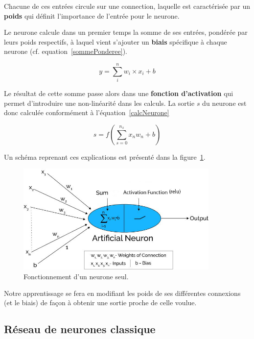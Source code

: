 Chacune de ces entrées circule sur une connection, laquelle est caractérisée par un \textbf{poids} qui définit l'importance de l'entrée pour le neurone.

Le neurone calcule dans un premier temps la somme de ses entrées, pondérée par leurs poids respectifs, à laquel vient s'ajouter un \textbf{biais} spécifique à chaque neurone (cf. equation~\ref{sommePonderee}).

\begin{equation}
\label{sommePonderee}
y = \sum_{i}^{n} w_i \times x_i + b
\end{equation}

Le résultat de cette somme passe alors dans une \textbf{fonction d'activation} qui permet d'introduire une non-linéarité dans les calculs. La sortie $s$ du neurone est donc calculée conformément à l'équation~\ref{calcNeurone}

\begin{equation}
\label{calcNeurone}
s = f(\sum_{s=0}^{n_{x}} x_{n}w_{n} + b)
\end{equation}

Un schéma reprenant ces explications est présenté dans la figure~\ref{neuroneSeul}.

\begin{figure}[h]
\centering
\includegraphics[width=10cm]{./images/image2.jpg}
\caption{Fonctionnement d'un neurone seul.\label{neuroneSeul}}
\end{figure}

Notre apprentissage se fera en modifiant les poids de ses différentes
connexions (et le biais) de façon à obtenir une sortie proche de celle voulue.

\hypertarget{Ruxe9seau-de-neurones-classique}{%
\subsection{Réseau de neurones classique}
\label{Ruxe9seau-de-neurones-classique}}

